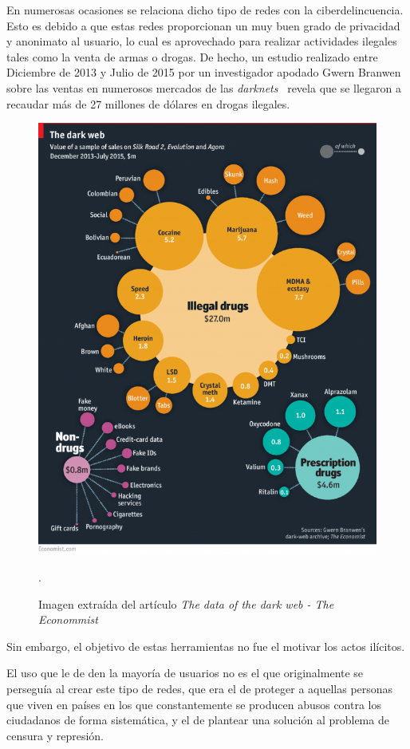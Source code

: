 En numerosas ocasiones se relaciona dicho tipo de redes con la ciberdelincuencia. Esto es debido a que estas redes proporcionan un muy buen grado de privacidad y anonimato al usuario, lo cual es aprovechado para realizar actividades ilegales tales como la venta de armas o drogas. 
De hecho, un estudio realizado entre Diciembre de 2013 y Julio de 2015 por un investigador apodado Gwern Branwen sobre las ventas en numerosos mercados de las \textit{darknets}~\cite{article:gwern} revela que se llegaron a recaudar más de 27 millones de dólares en drogas ilegales.

\begin{figure}[h]
	\centerline{
		\mbox{\includegraphics[width=5.00in]{images/darknet_markets.png}}
	}
	\caption{Imagen extraída del artículo \textit{The data of the dark web - The Econommist}~\cite{article:gwern}}.
	\label{fig:norm_Daugman}
\end{figure}

Sin embargo, el objetivo de estas herramientas no fue el motivar los actos ilícitos. 

El uso que le de den la mayoría de usuarios no es el que originalmente se perseguía al crear este tipo de redes, que era el de proteger a aquellas personas que viven en países en los que constantemente se producen abusos contra los ciudadanos de forma sistemática, y el de plantear una solución al problema de censura y represión.

